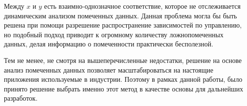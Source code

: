 Между $x$ и $y$ есть взаимно-однозначное соответствие, которое не отслеживается динамическим анализом помеченных данных. Данная проблема могла бы быть решена при помощи разрешение распространение зависимостей по управлению, но подобный подход приводит к огромному количеству ложнопомеченных данных, делая информацию о помеченности практически бесполезной.

Тем не менее, не смотря на вышеперечисленные недостатки, решение на основе анализ помеченных данных позволяет масштабироваться на настоящие приложения используемые в индустрии. Поэтому в рамках данной работы, было принято решение выбрать именно этот метод в качестве основы для дальнейших разработок.




